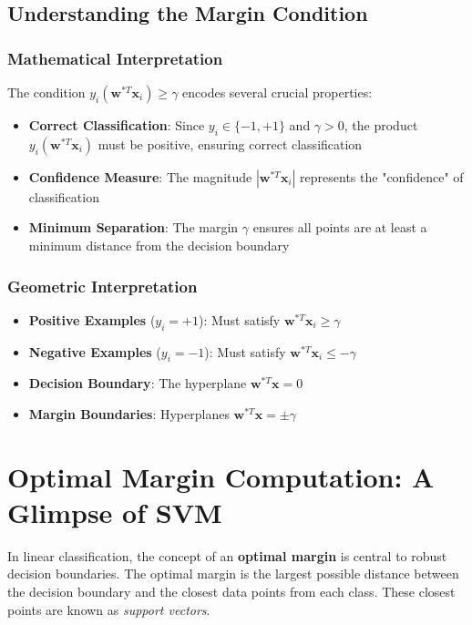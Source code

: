 \subsection{Understanding the Margin Condition}

\subsubsection{Mathematical Interpretation}
The condition \(y_i(\mathbf{w}^{*T} \mathbf{x}_i) \geq \gamma\) encodes several crucial properties:

\begin{itemize}
    \item \textbf{Correct Classification}: Since \(y_i \in \{-1, +1\}\) and \(\gamma > 0\), the product \(y_i(\mathbf{w}^{*T} \mathbf{x}_i)\) must be positive, ensuring correct classification
    \item \textbf{Confidence Measure}: The magnitude \(|\mathbf{w}^{*T} \mathbf{x}_i|\) represents the "confidence" of classification
    \item \textbf{Minimum Separation}: The margin \(\gamma\) ensures all points are at least a minimum distance from the decision boundary
\end{itemize}

\subsubsection{Geometric Interpretation}
\begin{itemize}
    \item \textbf{Positive Examples} (\(y_i = +1\)): Must satisfy \(\mathbf{w}^{*T} \mathbf{x}_i \geq \gamma\)
    \item \textbf{Negative Examples} (\(y_i = -1\)): Must satisfy \(\mathbf{w}^{*T} \mathbf{x}_i \leq -\gamma\)
    \item \textbf{Decision Boundary}: The hyperplane \(\mathbf{w}^{*T} \mathbf{x} = 0\)
    \item \textbf{Margin Boundaries}: Hyperplanes \(\mathbf{w}^{*T} \mathbf{x} = \pm\gamma\)
\end{itemize}

\section{Optimal Margin Computation: A Glimpse of SVM}

In linear classification, the concept of an \textbf{optimal margin} is central to robust decision boundaries. The optimal margin is the largest possible distance between the decision boundary and the closest data points from each class. These closest points are known as \textit{support vectors}.

